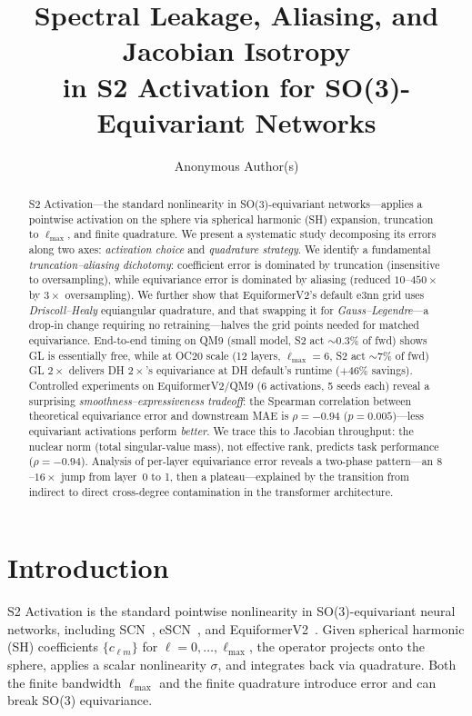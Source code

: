 \documentclass[10pt,twocolumn]{article}
\title{\vspace{-1em}\textbf{Spectral Leakage, Aliasing, and Jacobian Isotropy\\in S2 Activation for SO(3)-Equivariant Networks}\vspace{-0.5em}}
\author{%
  Anonymous Author(s)
}
\date{}
\begin{document}
\maketitle

\begin{abstract}
S2 Activation---the standard nonlinearity in SO(3)-equivariant networks---applies a
pointwise activation on the sphere via spherical harmonic (SH) expansion, truncation to
$\ell_{\max}$, and finite quadrature. We present a systematic study decomposing
its errors along two axes: \emph{activation choice} and \emph{quadrature strategy}.
We identify a fundamental \emph{truncation--aliasing dichotomy}: coefficient error is
dominated by truncation (insensitive to oversampling), while equivariance error is dominated
by aliasing (reduced $10$--$450\times$ by $3\times$ oversampling).
We further show that EquiformerV2's default e3nn grid uses \emph{Driscoll--Healy}
equiangular quadrature, and that swapping it for \emph{Gauss--Legendre}---a drop-in
change requiring no retraining---halves the grid points needed for matched
equivariance. End-to-end timing on QM9 (small model, S2 act $\sim$0.3\% of fwd) shows
GL is essentially free, while at OC20 scale (12 layers, $\ell_{\max}{=}6$, S2 act
$\sim$7\% of fwd) GL $2\times$ delivers DH $2\times$'s equivariance at DH default's
runtime ($+46\%$ savings).
Controlled experiments
on EquiformerV2/QM9 (6 activations, 5 seeds each) reveal a surprising
\emph{smoothness--expressiveness tradeoff}: the Spearman correlation between theoretical
equivariance error and downstream MAE is $\rho = -0.94$ ($p = 0.005$)---less equivariant
activations perform \emph{better}. We trace this to Jacobian throughput: the nuclear norm
(total singular-value mass), not effective rank, predicts task performance
($\rho = -0.94$). Analysis of per-layer equivariance error reveals a two-phase pattern---an
$8$--$16\times$ jump from layer~0 to 1, then a plateau---explained by the transition
from indirect to direct cross-degree contamination in the transformer architecture.
\end{abstract}

\section{Introduction}
\label{sec:intro}

S2 Activation is the standard pointwise nonlinearity in SO(3)-equivariant neural networks,
including SCN~\citep{scn}, eSCN~\citep{escn}, and EquiformerV2~\citep{equiformerv2}.
Given spherical harmonic (SH) coefficients $\{c_{\ell m}\}$ for
$\ell = 0,\dots,\ell_{\max}$, the operator projects onto the sphere, applies a scalar
nonlinearity $\sigma$, and integrates back via quadrature. Both the finite bandwidth
$\ell_{\max}$ and the finite quadrature introduce error and can break SO(3) equivariance.
\end{document}

